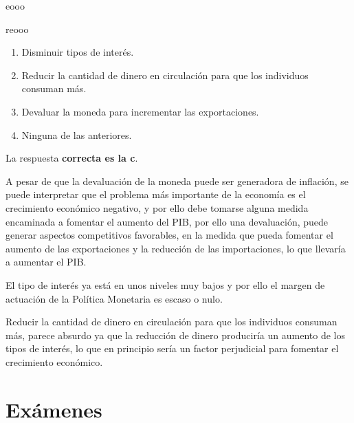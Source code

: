 \documentclass[
  letterpaper,
  DIV=11,
  numbers=noendperiod]{scrreprt}
\begin{document}
eooo

reooo

\begin{enumerate}
\def\labelenumi{\alph{enumi})}
\item
  Disminuir tipos de interés.
\item
  Reducir la cantidad de dinero en circulación para que los individuos
  consuman más.
\item
  Devaluar la moneda para incrementar las exportaciones.
\item
  Ninguna de las anteriores.
\end{enumerate}

\begin{tcolorbox}[enhanced jigsaw, opacityback=0, colback=white, breakable, leftrule=.75mm, rightrule=.15mm, arc=.35mm, toprule=.15mm, bottomrule=.15mm, left=2mm, colframe=quarto-callout-tip-color-frame]
\begin{minipage}[t]{5.5mm}
\textcolor{quarto-callout-tip-color}{\faLightbulb}
\end{minipage}%
\begin{minipage}[t]{\textwidth - 5.5mm}

La respuesta \textbf{correcta es la c}.

A pesar de que la devaluación de la moneda puede ser generadora de
inflación, se puede interpretar que el problema más importante de la
economía es el crecimiento económico negativo, y por ello debe tomarse
alguna medida encaminada a fomentar el aumento del PIB, por ello una
devaluación, puede generar aspectos competitivos favorables, en la
medida que pueda fomentar el aumento de las exportaciones y la reducción
de las importaciones, lo que llevaría a aumentar el PIB.

El tipo de interés ya está en unos niveles muy bajos y por ello el
margen de actuación de la Política Monetaria es escaso o nulo.

Reducir la cantidad de dinero en circulación para que los individuos
consuman más, parece absurdo ya que la reducción de dinero produciría un
aumento de los tipos de interés, lo que en principio sería un factor
perjudicial para fomentar el crecimiento económico.

\end{minipage}%
\end{tcolorbox}


\hypertarget{exuxe1menes}{%
\chapter{Exámenes}\label{exuxe1menes}}
\end{document}
